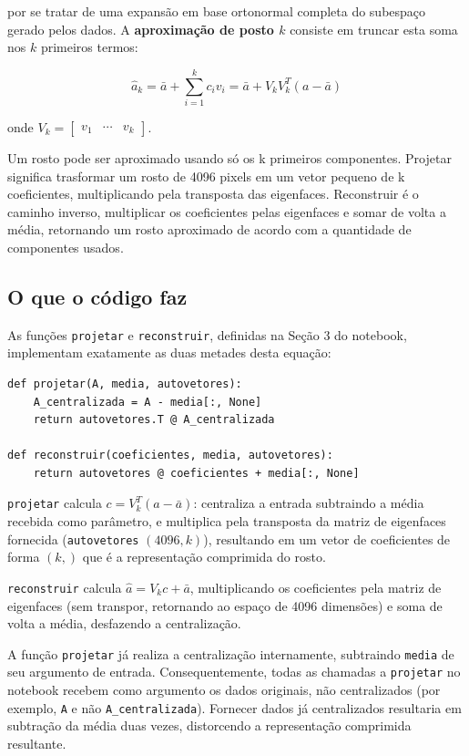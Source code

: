 \documentclass[12pt,a4paper]{article}
\begin{document}
por se tratar de uma expansão em base ortonormal completa do subespaço gerado pelos
dados. A \textbf{aproximação de posto $k$} consiste em truncar esta soma nos $k$ primeiros
termos:

$$\hat a_k = \bar a + \sum_{i=1}^{k} c_i v_i = \bar a + V_k V_k^T(a-\bar a)$$

onde $V_k = \begin{bmatrix}v_1&\cdots&v_k\end{bmatrix}$.

Um rosto pode ser aproximado usando só os k primeiros componentes. Projetar significa trasformar um rosto de 4096 pixels em um vetor pequeno de k coeficientes, multiplicando pela transposta das eigenfaces. Reconstruir é o caminho inverso, multiplicar os coeficientes pelas eigenfaces e somar de volta a média, retornando um rosto aproximado de acordo com a quantidade de componentes usados.

\subsection*{O que o código faz}

As funções \texttt{projetar} e \texttt{reconstruir}, definidas na Seção 3 do notebook, implementam
exatamente as duas metades desta equação:

\begin{lstlisting}
def projetar(A, media, autovetores):
    A_centralizada = A - media[:, None]
    return autovetores.T @ A_centralizada

def reconstruir(coeficientes, media, autovetores):
    return autovetores @ coeficientes + media[:, None]
\end{lstlisting}

\texttt{projetar} calcula $c = V_k^T(a-\bar a)$: centraliza a entrada subtraindo a média
recebida como parâmetro, e multiplica pela transposta da matriz de eigenfaces
fornecida (\texttt{autovetores} $(4096,k)$), resultando em um vetor de
coeficientes de forma $(k,)$ que é a representação comprimida do rosto.

\texttt{reconstruir} calcula $\hat a = V_kc+\bar a$, multiplicando os coeficientes pela matriz
de eigenfaces (sem transpor, retornando ao espaço de 4096 dimensões) e soma de volta
a média, desfazendo a centralização.

A função \texttt{projetar} já realiza a
centralização internamente, subtraindo \texttt{media} de seu argumento de entrada.
Consequentemente, todas as chamadas a \texttt{projetar} no notebook recebem como
argumento os dados originais, não centralizados (por exemplo, \texttt{A} e não
\texttt{A\_centralizada}). Fornecer dados já centralizados resultaria em subtração da média
duas vezes, distorcendo a representação comprimida resultante.
\end{document}
